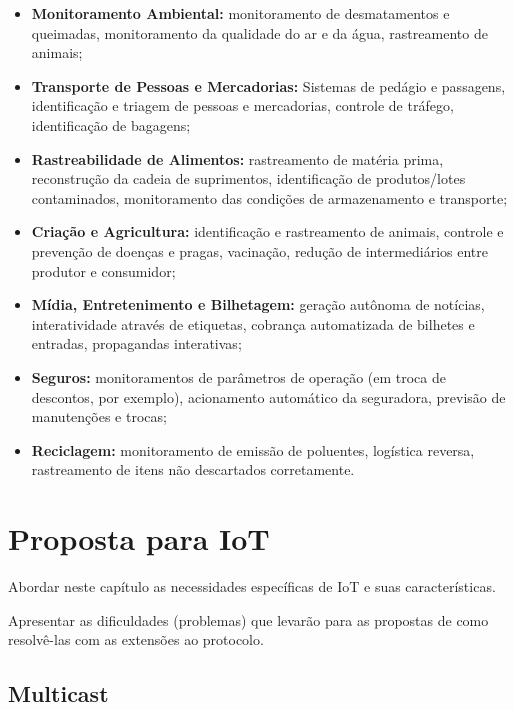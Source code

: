 \documentclass[twoside,english,brazilian]{UNISINOSmonografia}
\begin{document}
\begin{itemize}
	\item \textbf{Monitoramento Ambiental:}
monitoramento de desmatamentos e queimadas, monitoramento da qualidade do ar e 
da água, rastreamento de animais;
	
	\item \textbf{Transporte de Pessoas e Mercadorias:}
Sistemas de pedágio e passagens, identificação e triagem de pessoas e 
mercadorias, controle de tráfego, identificação de bagagens;
	
	\item \textbf{Rastreabilidade de Alimentos:}
rastreamento de matéria prima, reconstrução da cadeia de suprimentos, 
identificação de produtos/lotes contaminados, monitoramento das condições de 
armazenamento e transporte;
	
	\item \textbf{Criação e Agricultura:}
identificação e rastreamento de animais, controle e prevenção de doenças e 
pragas, vacinação, redução de intermediários entre produtor e consumidor;
	
	\item \textbf{Mídia, Entretenimento e Bilhetagem:}
geração autônoma de notícias, interatividade através de etiquetas, cobrança 
automatizada de bilhetes e entradas, propagandas interativas;
	
	\item \textbf{Seguros:}
monitoramentos de parâmetros de operação (em troca de descontos, por exemplo), 
acionamento automático da seguradora, previsão de manutenções e trocas;
	
	\item \textbf{Reciclagem:}
monitoramento de emissão de poluentes, logística reversa, rastreamento de 
itens não descartados corretamente.
	
\end{itemize}



\chapter{Proposta para IoT}

	Abordar neste capítulo as necessidades específicas de IoT e suas 
	características.
	
	Apresentar as dificuldades (problemas) que levarão para as propostas
	de como resolvê-las com as extensões ao protocolo.
	
	
	\section{Multicast}
		
\end{document}
